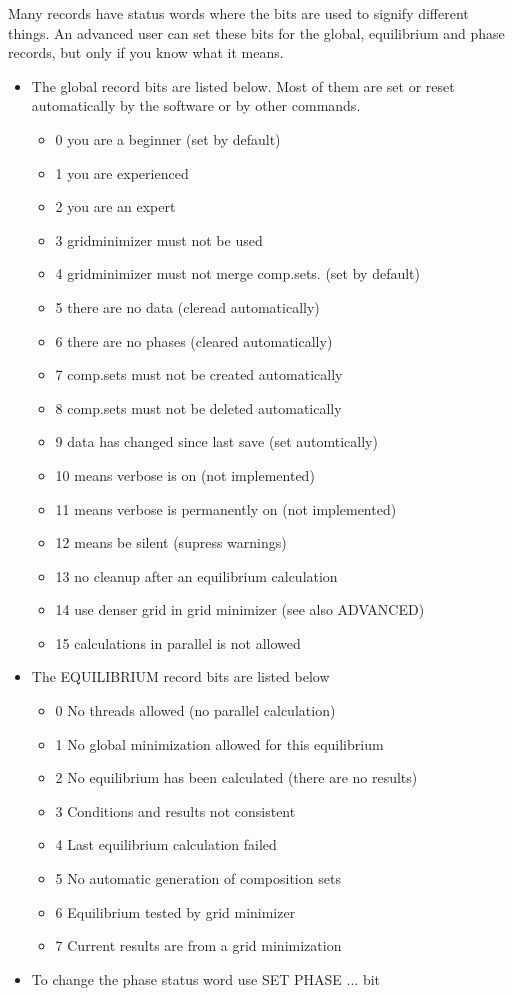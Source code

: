 \documentclass[12pt]{article}
\begin{document}
Many records have status words where the bits are used to signify
different things.  An advanced user can set these bits for the global,
equilibrium and phase records, but only if you know what it means.
\begin{itemize}
\item The global record bits are listed below.  Most of them are
  set or reset automatically by the software or by other commands.
  \begin{itemize}
  \item   0  you are a beginner (set by default)
  \item   1  you are experienced
  \item   2  you are an expert
  \item   3  gridminimizer must not be used
  \item   4  gridminimizer must not merge comp.sets. (set by default)
  \item   5  there are no data (cleread automatically)
  \item   6  there are no phases (cleared automatically)
  \item   7  comp.sets must not be created automatically
  \item   8  comp.sets must not be deleted automatically
  \item   9  data has changed since last save (set automtically)
  \item  10  means verbose is on (not implemented)
  \item  11  means verbose is permanently on (not implemented)
  \item  12  means be silent (supress warnings)
  \item  13  no cleanup after an equilibrium calculation
  \item  14  use denser grid in grid minimizer (see also ADVANCED)
  \item  15  calculations in parallel is not allowed
  \end{itemize}
\item The EQUILIBRIUM record bits are listed below
  \begin{itemize}
  \item   0  No threads allowed (no parallel calculation)
  \item   1  No global minimization allowed for this equilibrium
  \item   2  No equilibrium has been calculated (there are no results)
  \item   3  Conditions and results not consistent
  \item   4  Last equilibrium calculation failed
  \item   5  No automatic generation of composition sets
  \item   6  Equilibrium tested by grid minimizer
  \item   7  Current results are from a grid minimization
  \end{itemize}
\item To change the phase status word use SET PHASE ... bit
\end{itemize}
\end{document}
